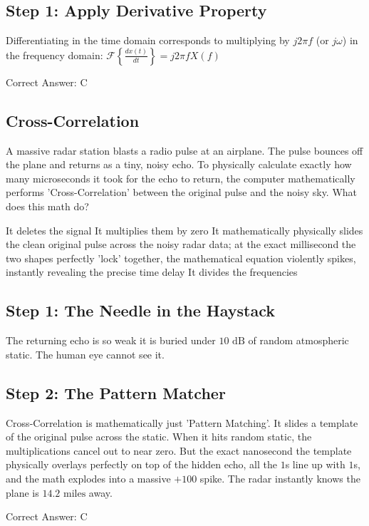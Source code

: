 \begin{solution}

\subsection*{Step 1: Apply Derivative Property}
Differentiating in the time domain corresponds to multiplying by $j 2\pi f$ (or $j\omega$) in the frequency domain:
$\mathcal{F}\left\{\frac{dx(t)}{dt}\right\} = j 2\pi f X(f)$

Correct Answer: C
\end{solution}

\clearpage

\subsection{Cross-Correlation}

A massive radar station blasts a radio pulse at an airplane. The pulse bounces off the plane and returns as a tiny, noisy echo. To physically calculate exactly how many microseconds it took for the echo to return, the computer mathematically performs 'Cross-Correlation' between the original pulse and the noisy sky. What does this math do?

\begin{choices}
    \choice It deletes the signal
    \choice It multiplies them by zero
    \correctchoice It mathematically physically slides the clean original pulse across the noisy radar data; at the exact millisecond the two shapes perfectly 'lock' together, the mathematical equation violently spikes, instantly revealing the precise time delay
    \choice It divides the frequencies
\end{choices}

\begin{solution}

\subsection*{Step 1: The Needle in the Haystack}
The returning echo is so weak it is buried under $10\text{ dB}$ of random atmospheric static. The human eye cannot see it.

\subsection*{Step 2: The Pattern Matcher}
Cross-Correlation is mathematically just 'Pattern Matching'. It slides a template of the original pulse across the static. When it hits random static, the multiplications cancel out to near zero. But the exact nanosecond the template physically overlays perfectly on top of the hidden echo, all the $1$s line up with $1$s, and the math explodes into a massive $+100$ spike. The radar instantly knows the plane is $14.2\text{ miles}$ away.

Correct Answer: C
\end{solution}

